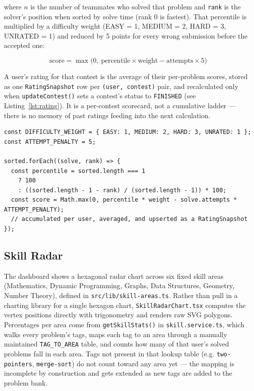 \documentclass[11pt]{article}
\begin{document}
where $n$ is the number of teammates who solved that problem and \texttt{rank} is the solver's position when sorted by solve time (rank 0 is fastest). That percentile is multiplied by a difficulty weight (EASY = 1, MEDIUM = 2, HARD = 3, UNRATED = 1) and reduced by 5 points for every wrong submission before the accepted one:

\[
\text{score} = \max\!\big(0,\ \text{percentile} \times \text{weight} - \text{attempts} \times 5\big)
\]

A user's rating for that contest is the average of their per-problem scores, stored as one \texttt{RatingSnapshot} row per \texttt{(user, contest)} pair, and recalculated only when \texttt{updateContest()} sets a contest's status to \texttt{FINISHED} (see Listing~\ref{lst:rating}). It is a per-contest scorecard, not a cumulative ladder --- there is no memory of past ratings feeding into the next calculation.

\begin{lstlisting}[caption={Core scoring loop from \texttt{rating.service.ts}.}, label={lst:rating}]
const DIFFICULTY_WEIGHT = { EASY: 1, MEDIUM: 2, HARD: 3, UNRATED: 1 };
const ATTEMPT_PENALTY = 5;

sorted.forEach((solve, rank) => {
  const percentile = sorted.length === 1
    ? 100
    : ((sorted.length - 1 - rank) / (sorted.length - 1)) * 100;
  const score = Math.max(0, percentile * weight - solve.attempts * ATTEMPT_PENALTY);
  // accumulated per user, averaged, and upserted as a RatingSnapshot
});
\end{lstlisting}

\subsection{Skill Radar}

The dashboard shows a hexagonal radar chart across six fixed skill areas (Mathematics, Dynamic Programming, Graphs, Data Structures, Geometry, Number Theory), defined in \texttt{src/lib/skill-areas.ts}. Rather than pull in a charting library for a single hexagon chart, \texttt{SkillRadarChart.tsx} computes the vertex positions directly with trigonometry and renders raw SVG polygons. Percentages per area come from \texttt{getSkillStats()} in \texttt{skill.service.ts}, which walks every problem's tags, maps each tag to an area through a manually maintained \texttt{TAG\_TO\_AREA} table, and counts how many of that user's solved problems fall in each area. Tags not present in that lookup table (e.g. \texttt{two-pointers}, \texttt{merge-sort}) do not count toward any area yet --- the mapping is incomplete by construction and gets extended as new tags are added to the problem bank.
\end{document}
